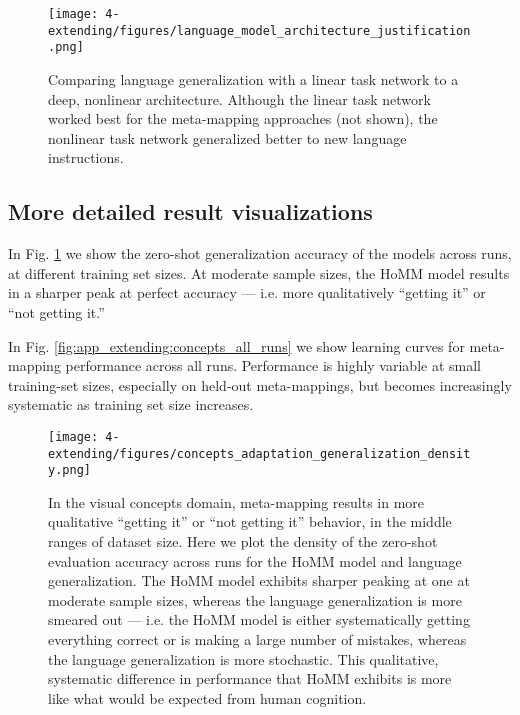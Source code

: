 \begin{figure}
\texttt{[image: 4-extending/figures/language\_model\_architecture\_justification.png]}
\caption[Comparing language generalization with linear vs. deep-nonlinear task-networks.]{Comparing language generalization with a linear task network to a deep, nonlinear architecture. Although the linear task network worked best for the meta-mapping approaches (not shown), the nonlinear task network generalized better to new language instructions.}
\end{figure}

\subsection{More detailed result visualizations}
In Fig. \ref{fig:app_extending:concepts_generalization_density} we show the zero-shot generalization accuracy of the models across runs, at different training set sizes. At moderate sample sizes, the HoMM model results in a sharper peak at perfect accuracy --- i.e. more qualitatively ``getting it'' or ``not getting it.'' \par 
In Fig. \ref{fig:app_extending:concepts_all_runs} we show learning curves for meta-mapping performance across all runs. Performance is highly variable at small training-set sizes, especially on held-out meta-mappings, but becomes increasingly systematic as training set size increases.\par

\begin{figure}[H]
\centering
\texttt{[image: 4-extending/figures/concepts\_adaptation\_generalization\_density.png]}
\caption[Visual concept generalization densities.]{In the visual concepts domain, meta-mapping results in more qualitative ``getting it'' or ``not getting it'' behavior, in the middle ranges of dataset size. Here we plot the density of the zero-shot evaluation accuracy across runs for the HoMM model and language generalization. The HoMM model exhibits sharper peaking at one at moderate sample sizes, whereas the language generalization is more smeared out --- i.e. the HoMM model is either systematically getting everything correct or is making a large number of mistakes, whereas the language generalization is more stochastic. This qualitative, systematic difference in performance that HoMM exhibits is more like what would be expected from human cognition.}\label{fig:app_extending:concepts_generalization_density}
\end{figure}

